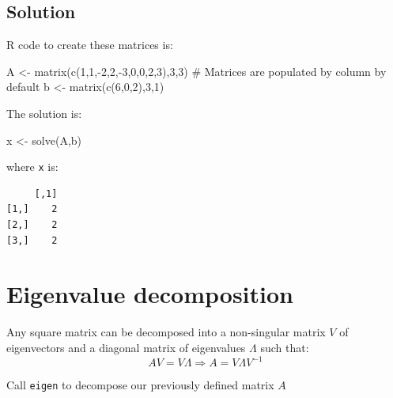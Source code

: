 \documentclass[
  letterpaper,
]{book}
\newenvironment{Shaded}{\begin{snugshade}}{\end{snugshade}}
\newcommand{\CommentTok}[1]{\textcolor[rgb]{0.37,0.37,0.37}{#1}}
\newcommand{\DecValTok}[1]{\textcolor[rgb]{0.68,0.00,0.00}{#1}}
\newcommand{\FunctionTok}[1]{\textcolor[rgb]{0.28,0.35,0.67}{#1}}
\newcommand{\NormalTok}[1]{\textcolor[rgb]{0.00,0.23,0.31}{#1}}
\newcommand{\OtherTok}[1]{\textcolor[rgb]{0.00,0.23,0.31}{#1}}
\newcommand{\SpecialCharTok}[1]{\textcolor[rgb]{0.37,0.37,0.37}{#1}}
\begin{document}
\hypertarget{solution}{%
\subsection{Solution}\label{solution}}

R code to create these matrices is:

\begin{Shaded}
\begin{Highlighting}[]
\NormalTok{A }\OtherTok{\textless{}{-}} \FunctionTok{matrix}\NormalTok{(}\FunctionTok{c}\NormalTok{(}\DecValTok{1}\NormalTok{,}\DecValTok{1}\NormalTok{,}\SpecialCharTok{{-}}\DecValTok{2}\NormalTok{,}\DecValTok{2}\NormalTok{,}\SpecialCharTok{{-}}\DecValTok{3}\NormalTok{,}\DecValTok{0}\NormalTok{,}\DecValTok{0}\NormalTok{,}\DecValTok{2}\NormalTok{,}\DecValTok{3}\NormalTok{),}\DecValTok{3}\NormalTok{,}\DecValTok{3}\NormalTok{) }\CommentTok{\# Matrices are populated by column by default}
\NormalTok{b }\OtherTok{\textless{}{-}} \FunctionTok{matrix}\NormalTok{(}\FunctionTok{c}\NormalTok{(}\DecValTok{6}\NormalTok{,}\DecValTok{0}\NormalTok{,}\DecValTok{2}\NormalTok{),}\DecValTok{3}\NormalTok{,}\DecValTok{1}\NormalTok{)}
\end{Highlighting}
\end{Shaded}

The solution is:

\begin{Shaded}
\begin{Highlighting}[]
\NormalTok{x }\OtherTok{\textless{}{-}} \FunctionTok{solve}\NormalTok{(A,b)}
\end{Highlighting}
\end{Shaded}

where \texttt{x} is:

\begin{verbatim}
     [,1]
[1,]    2
[2,]    2
[3,]    2
\end{verbatim}

\hypertarget{eigenvalue-decomposition}{%
\section{Eigenvalue decomposition}\label{eigenvalue-decomposition}}

Any square matrix can be decomposed into a non-singular matrix \(V\) of
eigenvectors and a diagonal matrix of eigenvalues \(\Lambda\) such that:
\[
A V = V \Lambda \Rightarrow A = V\Lambda V^{-1}
\]

Call \texttt{eigen} to decompose our previously defined matrix \(A\)
\end{document}
